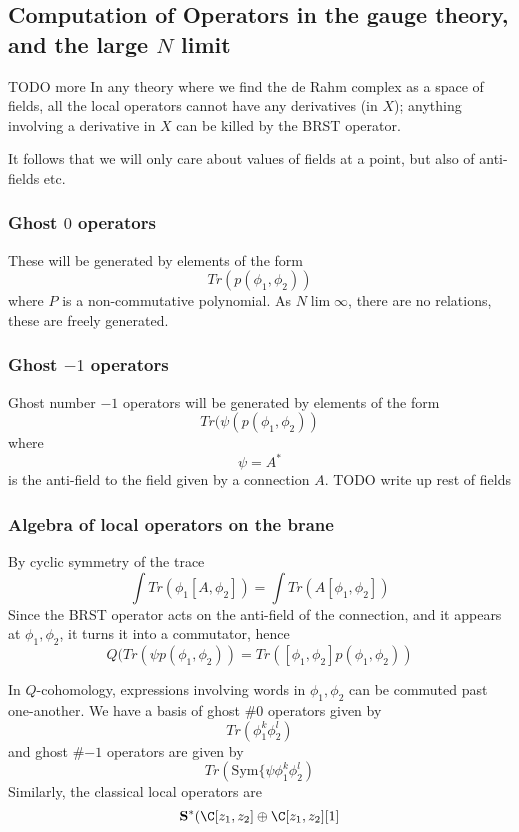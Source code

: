 \documentclass[12pt]{amsart}
\begin{document}
\subsection{Computation of Operators in the gauge theory, and the large $N$
limit}

TODO more
In any theory where we find the de Rahm complex as a space of fields, all the
local operators cannot have any derivatives (in $X$); anything involving a
derivative in $X$ can be killed by the BRST operator.\par

It follows that we will only care about values of fields at a point, but also
of anti-fields etc.\

\subsubsection{Ghost $0$ operators}
These will be generated by elements of the form $$Tr(p(\phi_1,\phi_2))$$ where $P$ is a
non-commutative polynomial\footnotemark.
As $N \lim \infty$, there are no relations, these are freely generated.
\subsubsection{Ghost $-1$ operators}
Ghost number $-1$ operators will be generated by elements of the form
$$Tr(\psi(p(\phi_1,\phi_2))$$
  where $$\psi = A^*$$
  is the anti-field to the field given by a connection $A$.
  TODO write up rest of fields

\subsubsection{Algebra of local operators on the brane}
By cyclic symmetry of the trace $$\int Tr(\phi_1[A,\phi_2]) = \int
Tr(A[\phi_1,\phi_2])$$
Since the BRST operator acts on the anti-field of the connection, and it
appears at $\phi_1,\phi_2$, it turns it into a commutator, hence
$$Q(Tr(\psi p(\phi_1,\phi_2)) = Tr([\phi_1,\phi_2]p(\phi_1,\phi_2))$$

\begin{cor}
  In $Q$-cohomology, expressions involving words in $\phi_1,\phi_2$ can be
  commuted past one-another. We have a basis of ghost \#$0$ operators given by
  $$Tr(\phi_1^k\phi_2^l)$$
  and ghost \#$-1$ operators are given by\footnotemark $$Tr(\mathrm{Sym}\{\psi \phi_1^k
    \phi_2^l)$$
    Similarly, the classical local operators are $$\mathbf{S}^*(\C[z_1,z_2]
      \oplus \C[z_1,z_2][1]$$
\end{cor}
\end{document}
